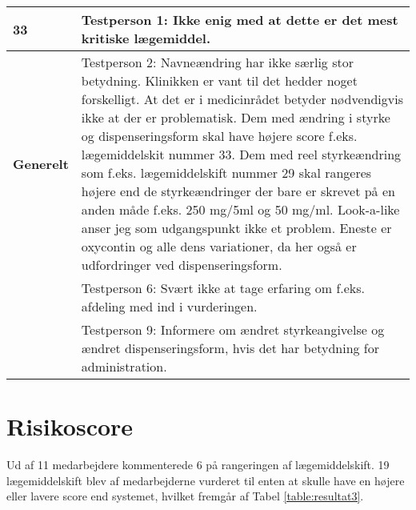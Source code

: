 \begin{longtable} {|p{2.2cm}|p{12cm}|}
\cellcolor[HTML]{C0C0C0}\textbf{33} & Testperson 1: Ikke enig med at dette er det mest kritiske lægemiddel. \\ \hline
\cellcolor[HTML]{C0C0C0}\textbf{Generelt}\multirow{3}{*} & Testperson 2: Navneændring har ikke særlig stor betydning. Klinikken er vant til det hedder noget forskelligt. At det er i medicinrådet betyder nødvendigvis ikke at der er problematisk. Dem med ændring i styrke og dispenseringsform skal have højere score f.eks. lægemiddelskit nummer 33.  Dem med reel styrkeændring som f.eks. lægemiddelskift nummer 29 skal rangeres højere end de styrkeændringer der bare er skrevet på en anden måde f.eks. 250 mg/5ml og 50 mg/ml. Look-a-like anser jeg som udgangspunkt ikke et problem. Eneste er oxycontin og alle dens variationer, da her også er udfordringer ved dispenseringsform.  \\ \cline{2-2}
\cellcolor[HTML]{C0C0C0}    & Testperson 6: Svært ikke at tage erfaring om f.eks. afdeling med ind i vurderingen. \\ \cline{2-2}
\cellcolor[HTML]{C0C0C0}                & Testperson 9: Informere om ændret styrkeangivelse og ændret dispenseringsform, hvis det har betydning for administration. \\ \hline
	\end{longtable}

\newpage
\section{Risikoscore} \label{App:Rang}
Ud af 11 medarbejdere kommenterede 6 på rangeringen af lægemiddelskift. 19 lægemiddelskift blev af medarbejderne vurderet til enten at skulle have en højere eller lavere score end systemet, hvilket fremgår af Tabel \ref{table:resultat3}.

